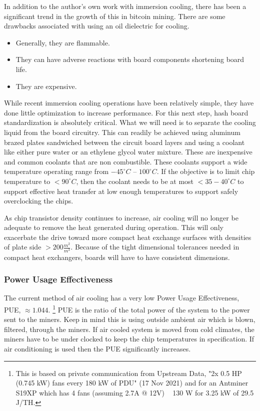 \documentclass[runningheads]{llncs}
\begin{document}
In addition to the author's own work with immersion cooling, there has been a significant trend in the growth of this in bitcoin mining.
There are some drawbacks associated with using an oil dielectric for cooling.
\begin{itemize}
    \item Generally, they are flammable.
    \item They can have adverse reactions with board components shortening board life.
    \item They are expensive.
\end{itemize}

While recent immersion cooling operations have been relatively simple, they have done little optimization to increase performance.
For this next step, hash board standardization is absolutely critical.
What we will need is to separate the cooling liquid from the board circuitry.
This can readily be achieved using aluminum brazed plates sandwiched between the circuit board layers and using a coolant like either pure water or an ethylene glycol water mixture.
These are inexpensive and common coolants that are non combustible.
These coolants support a wide temperature operating range from $-45^{\circ}C$ -- $100^{\circ}C$.
If the objective is to limit chip temperature to $<90^{\circ}C$, then the coolant needs to be at most $<35-40^{\circ}C$ to support effective heat transfer at low enough temperatures to support safely overclocking the chips.

As chip transistor density continues to increase, air cooling will no longer be adequate to remove the heat generated during operation.
This will only exacerbate the drive toward more compact heat exchange surfaces with densities of plate side $>200\frac{m^2}{m^3}$.
Because of the tight dimensional tolerances needed in compact heat exchangers, boards will have to have consistent dimensions.

\subsubsection{Power Usage Effectiveness}
The current method of air cooling has a very low Power Usage Effectiveness, PUE, $\approx 1.044$.
\footnote{This is based on private communication from Upstream Data, "2x 0.5 HP (0.745 kW) fans every 180 kW of PDU" (17 Nov 2021) and for an Antminer S19XP  which has 4 fans (assuming 2.7A @ 12V) ~ 130 W for 3.25 kW of 29.5 J/TH.}
PUE is the ratio of the total power of the system to the power sent to the miners.
Keep in mind this is using outside ambient air which is blown, filtered, through the miners.
If air cooled system is moved from cold climates, the miners have to be under clocked to keep the chip temperatures in specification.
If air conditioning is used then the PUE significantly increases.
\end{document}

